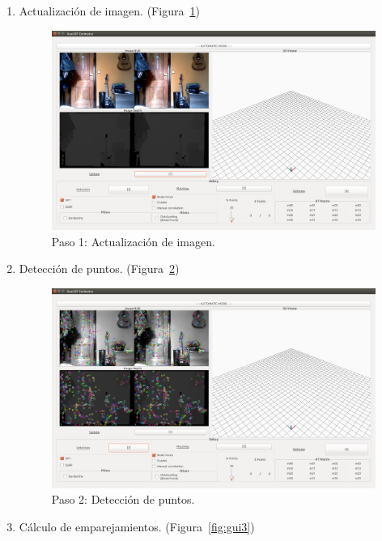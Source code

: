 \begin{enumerate}
\item Actualización de imagen. (Figura~\ref{fig:gui1})

\begin{figure}[th]
\centering
\includegraphics[scale=0.3]{Figures/gui1.png}
\decoRule
\caption[gui1]{Paso 1: Actualización de imagen.}
\label{fig:gui1}
\end{figure}

\item Detección de puntos. (Figura~\ref{fig:gui2})

\begin{figure}[th]
\centering
\includegraphics[scale=0.3]{Figures/gui2.png}
\decoRule
\caption[gui2]{Paso 2: Detección de puntos.}
\label{fig:gui2}
\end{figure}
 
\item Cálculo de emparejamientos. (Figura~\ref{fig:gui3})


\end{enumerate}
